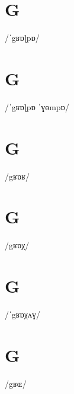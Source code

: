\documentclass[10pt,a4paper,twoside]{book}
\begin{document}
\section*{G}

\begin{multicols}{3}
 {/ˈgʁɒɭpɒ/} {}
\end{multicols}

\section*{G}

\begin{multicols}{3}
 {/ˈgʁɒɭpɒ ˈɣɵmpɒ/} {}
\end{multicols}

\section*{G}

\begin{multicols}{3}
 {/gʁɒʁ/} {}
\end{multicols}

\section*{G}

\begin{multicols}{3}
 {/gʁɒχ/} {}
\end{multicols}

\section*{G}

\begin{multicols}{3}
 {/ˈgʁɒχʌɣ/} {}
\end{multicols}

\section*{G}

\begin{multicols}{3}
 {/gʁɶ/} {}
\end{multicols}
\end{document}

